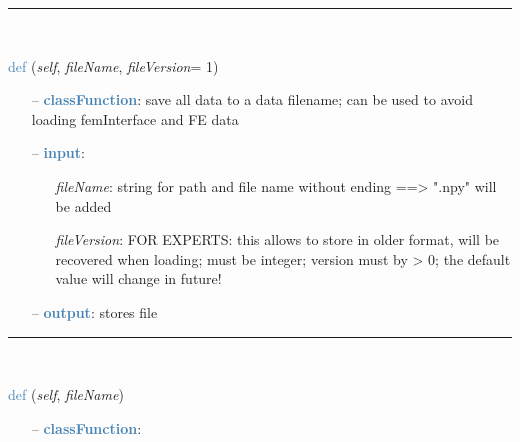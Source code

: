 \begin{itemize}[leftmargin=1.4cm]
\begin{itemize}[leftmargin=1.4cm]
\begin{itemize}[leftmargin=1.4cm]
\begin{itemize}[leftmargin=0.5cm]
\begin{itemize}[leftmargin=1.4cm]
\begin{itemize}[leftmargin=1.4cm]
\begin{itemize}[leftmargin=0.5cm]
\begin{itemize}[leftmargin=0.7cm]
\begin{itemize}[leftmargin=1.2cm]
\end{itemize}
\vspace{12pt}\end{itemize}
%
\noindent\rule{8cm}{0.75pt}\vspace{1pt} \\ 
\begin{flushleft}
\noindent \textcolor{steelblue}{def {\bf {}}}\label{sec:FEM:ObjectFFRFreducedOrderInterface:SaveToFile}
({\it self}, {\it fileName}, {\it fileVersion}= 1)
\end{flushleft}
\setlength{\itemindent}{0.7cm}
\begin{itemize}[leftmargin=0.7cm]
\item[--]\textcolor{steelblue}{\bf classFunction}: save all data to a data filename; can be used to avoid loading femInterface and FE data
\item[--]\textcolor{steelblue}{\bf input}: \vspace{-6pt}
\begin{itemize}[leftmargin=1.2cm]
\setlength{\itemindent}{-0.7cm}
\item[]{\it fileName}: string for path and file name without ending ==> ".npy" will be added
\item[]{\it fileVersion}: FOR EXPERTS: this allows to store in older format, will be recovered when loading; must be integer; version must by > 0; the default value will change in future!
\end{itemize}
\item[--]\textcolor{steelblue}{\bf output}: stores file
\vspace{12pt}\end{itemize}
%
\noindent\rule{8cm}{0.75pt}\vspace{1pt} \\ 
\begin{flushleft}
\noindent \textcolor{steelblue}{def {\bf {}}}\label{sec:FEM:ObjectFFRFreducedOrderInterface:LoadFromFile}
({\it self}, {\it fileName})
\end{flushleft}
\setlength{\itemindent}{0.7cm}
\begin{itemize}[leftmargin=0.7cm]
\item[--]\textcolor{steelblue}{\bf classFunction}: \vspace{-6pt}
\begin{itemize}[leftmargin=1.2cm]

\end{itemize}
\end{itemize}
\end{itemize}
\end{itemize}
\end{itemize}
\end{itemize}
\end{itemize}
\end{itemize}
\end{itemize}

